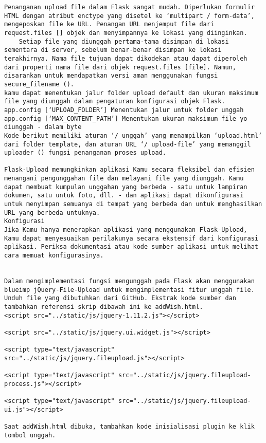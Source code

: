 \documentclass[12pt,a4paper]{article}
\begin{document}
\begin{verbatim}
Penanganan upload file dalam Flask sangat mudah. Diperlukan formulir HTML dengan atribut enctype yang disetel ke ‘multipart / form-data’, mengeposkan file ke URL. Penangan URL menjemput file dari request.files [] objek dan menyimpannya ke lokasi yang diinginkan.
	Setiap file yang diunggah pertama-tama disimpan di lokasi sementara di server, sebelum benar-benar disimpan ke lokasi terakhirnya. Nama file tujuan dapat dikodekan atau dapat diperoleh dari properti nama file dari objek request.files [file]. Namun, disarankan untuk mendapatkan versi aman menggunakan fungsi secure_filename ().
kamu dapat menentukan jalur folder upload default dan ukuran maksimum file yang diunggah dalam pengaturan konfigurasi objek Flask.
app.config [‘UPLOAD_FOLDER’] Menentukan jalur untuk folder unggah
app.config [‘MAX_CONTENT_PATH’] Menentukan ukuran maksimum file yo diunggah - dalam byte
Kode berikut memiliki aturan ‘/ unggah’ yang menampilkan ‘upload.html’ dari folder template, dan aturan URL ‘/ upload-file’ yang memanggil uploader () fungsi penanganan proses upload.

Flask-Upload memungkinkan aplikasi Kamu secara fleksibel dan efisien menangani pengunggahan file dan melayani file yang diunggah. Kamu dapat membuat kumpulan unggahan yang berbeda - satu untuk lampiran dokumen, satu untuk foto, dll. - dan aplikasi dapat dikonfigurasi untuk menyimpan semuanya di tempat yang berbeda dan untuk menghasilkan URL yang berbeda untuknya.
Konfigurasi
Jika Kamu hanya menerapkan aplikasi yang menggunakan Flask-Upload, Kamu dapat menyesuaikan perilakunya secara ekstensif dari konfigurasi aplikasi. Periksa dokumentasi atau kode sumber aplikasi untuk melihat cara memuat konfigurasinya.


Dalam mengimplementasi fungsi mengunggah pada Flask akan menggunakan blueimp jQuery-File-Upload untuk mengimplementasi fitur unggah file. Unduh file yang dibutuhkan dari GitHub. Ekstrak kode sumber dan tambahkan referensi skrip dibawah ini ke addWish.html.
<script src="../static/js/jquery-1.11.2.js"></script>
 
<script src="../static/js/jquery.ui.widget.js"></script>
 
<script type="text/javascript" src="../static/js/jquery.fileupload.js"></script>
 
<script type="text/javascript" src="../static/js/jquery.fileupload-process.js"></script>
 
<script type="text/javascript" src="../static/js/jquery.fileupload-ui.js"></script>

Saat addWish.html dibuka, tambahkan kode inisialisasi plugin ke klik tombol unggah.
\end{verbatim}
\end{document}
